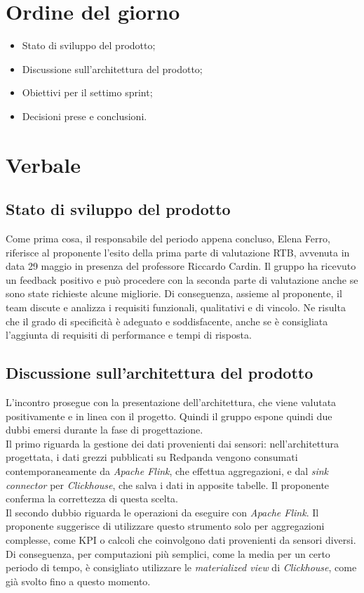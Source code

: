 \documentclass[italian,12pt]{article}
\begin{document}
\section{Ordine del giorno}
\begin{itemize}
	\item Stato di sviluppo del prodotto;
	\item Discussione sull'architettura del prodotto;
	\item Obiettivi per il settimo sprint;
	\item Decisioni prese e conclusioni.
\end{itemize}

\newpage

\section{Verbale}

\subsection{Stato di sviluppo del prodotto}
Come prima cosa, il responsabile del periodo appena concluso, Elena Ferro, riferisce al proponente l'esito della prima parte di valutazione RTB,
avvenuta in data 29 maggio in presenza del professore Riccardo Cardin. Il gruppo ha ricevuto un feedback positivo e può procedere con la seconda
parte di valutazione anche se sono state richieste alcune migliorie. Di conseguenza, assieme al proponente, il team discute e analizza
i requisiti funzionali, qualitativi e di vincolo. Ne risulta che il grado di specificità è adeguato e soddisfacente, anche se è consigliata l'aggiunta
di requisiti di performance e tempi di risposta.

\subsection{Discussione sull'architettura del prodotto}
L'incontro prosegue con la presentazione dell'architettura, che viene valutata positivamente e in linea con il progetto.
Quindi il gruppo espone quindi due dubbi emersi durante la fase di progettazione.\\\linebreak
Il primo riguarda la gestione dei dati provenienti dai sensori: nell'architettura progettata, i dati grezzi pubblicati su Redpanda vengono consumati contemporaneamente da \textit{Apache Flink}, che effettua aggregazioni,
e dal \textit{sink connector} per \textit{Clickhouse}, che salva i dati in apposite tabelle. Il proponente conferma la correttezza di questa scelta.\\\linebreak
Il secondo dubbio riguarda le operazioni da eseguire con \textit{Apache Flink}. Il proponente suggerisce di utilizzare questo strumento solo per aggregazioni complesse, come KPI o calcoli che coinvolgono dati provenienti da sensori diversi.
Di conseguenza, per computazioni più semplici, come la media per un certo periodo di tempo, è consigliato utilizzare le \textit{materialized view} di \textit{Clickhouse}, come già svolto fino a questo momento.
\end{document}
